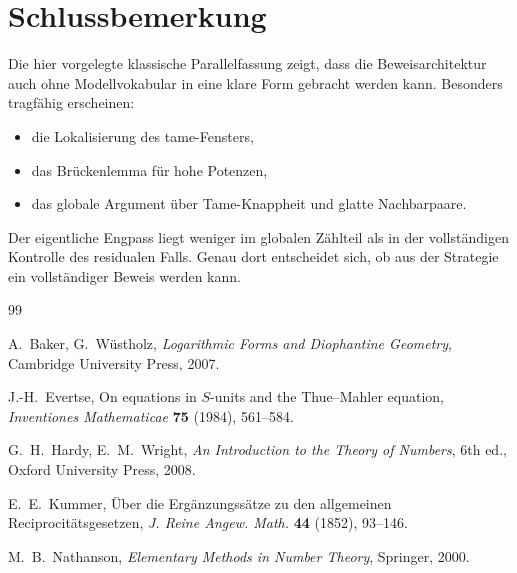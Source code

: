 \documentclass[12pt,a4paper]{article}
\theoremstyle{plain}
\theoremstyle{definition}
\theoremstyle{remark}
\begin{document}
	\section{Schlussbemerkung}
	
	Die hier vorgelegte klassische Parallelfassung zeigt, dass die Beweisarchitektur auch ohne Modellvokabular in eine klare Form gebracht werden kann. Besonders tragfähig erscheinen:
	
	\begin{itemize}
		\item die Lokalisierung des tame-Fensters,
		\item das Brückenlemma für hohe Potenzen,
		\item das globale Argument über Tame-Knappheit und glatte Nachbarpaare.
	\end{itemize}
	
	Der eigentliche Engpass liegt weniger im globalen Zählteil als in der vollständigen Kontrolle des residualen Falls. Genau dort entscheidet sich, ob aus der Strategie ein vollständiger Beweis werden kann.
	
	\begin{thebibliography}{99}
		
		A.~Baker, G.~Wüstholz,
		\emph{Logarithmic Forms and Diophantine Geometry},
		Cambridge University Press, 2007.
		
		J.-H.~Evertse,
		On equations in \(S\)-units and the Thue--Mahler equation,
		\emph{Inventiones Mathematicae} \textbf{75} (1984), 561--584.
		
		G.~H.~Hardy, E.~M.~Wright,
		\emph{An Introduction to the Theory of Numbers},
		6th ed., Oxford University Press, 2008.
		
		E.~E.~Kummer,
		Über die Ergänzungssätze zu den allgemeinen Reciprocitätsgesetzen,
		\emph{J. Reine Angew. Math.} \textbf{44} (1852), 93--146.
		
		M.~B.~Nathanson,
		\emph{Elementary Methods in Number Theory},
		Springer, 2000.
		
	\end{thebibliography}
	
\end{document}

